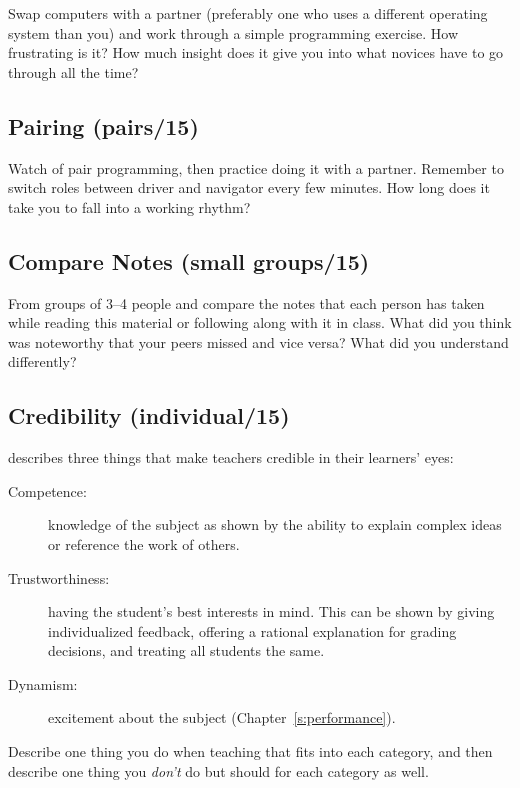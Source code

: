 Swap computers with a partner (preferably one who uses a different
operating system than you) and work through a simple programming
exercise. How frustrating is it? How much insight does it give you into
what novices have to go through all the time?

\subsection*{Pairing (pairs/15)}

Watch  of pair programming, then
practice doing it with a partner. Remember to switch roles between
driver and navigator every few minutes. How long does it take you to
fall into a working rhythm?

\subsection*{Compare Notes (small groups/15)}

From groups of 3--4 people and compare the notes that each person has
taken while reading this material or following along with it in class.
What did you think was noteworthy that your peers missed and vice versa?
What did you understand differently?

\subsection*{Credibility (individual/15)}

\cite{Fink2013} describes three things that make teachers credible in
their learners' eyes:

\begin{description}
\item[Competence:]
knowledge of the subject as shown by the ability to explain complex
ideas or reference the work of others.
\item[Trustworthiness:]
having the student's best interests in mind. This can be shown by
giving individualized feedback, offering a rational explanation for
grading decisions, and treating all students the same.
\item[Dynamism:]
excitement about the subject (Chapter~\ref{s:performance}).
\end{description}

Describe one thing you do when teaching that fits into each category,
and then describe one thing you \emph{don't} do but should for each category
as well.

